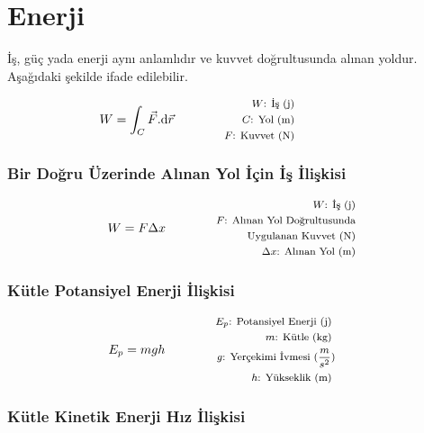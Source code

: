 \section{Enerji}

İş, güç yada enerji aynı anlamlıdır ve kuvvet doğrultusunda alınan yoldur. Aşağıdaki şekilde ifade edilebilir.

\begin{equation}
    W = \int_{C} \vec{F}\text{.d}\vec{r} \qquad \qquad \parbox{4cm}{\footnotesize$\begin{aligned}
        W\text{: İş (j)} \\
        C\text{: Yol (m)} \\
        F\text{: Kuvvet (N)}
\end{aligned}$}
\end{equation}

\subsubsection*{Bir Doğru Üzerinde Alınan Yol İçin İş İlişkisi}
\begin{equation}
    W = F \Delta x  \qquad \qquad \parbox{4cm}{\footnotesize$\begin{aligned}
        W\text{: İş (j)} \\
        F\text{: Alınan Yol Doğrultusunda} \\ \text{Uygulanan Kuvvet (N)} \\
        \Delta x\text{: Alınan Yol (m)}
\end{aligned}$}
\end{equation}

\subsubsection*{Kütle Potansiyel Enerji İlişkisi}

\begin{equation}
    E_p = mgh \qquad \qquad \parbox{4cm}{\footnotesize$\begin{aligned}
        E_p\text{: Potansiyel Enerji (j) } \\
        m\text{: Kütle (kg) } \\
        g\text{: Yerçekimi İvmesi } (\frac{m}{s^2}) \\ 
        h\text{: Yükseklik (m) }
    \end{aligned}$}
\end{equation}

\subsubsection*{Kütle Kinetik Enerji Hız İlişkisi}

